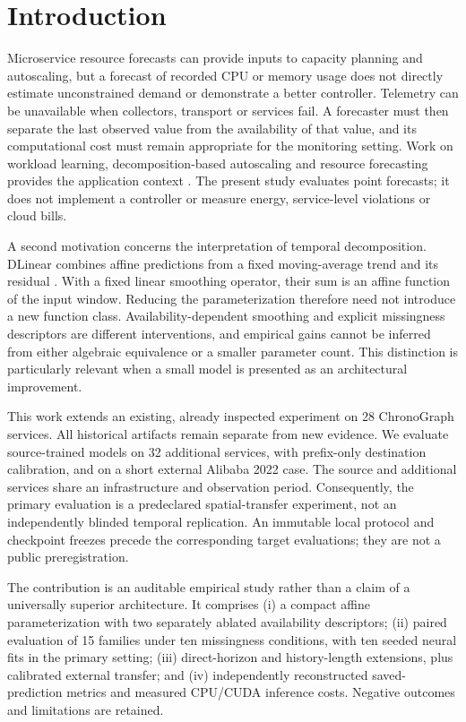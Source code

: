\section{Introduction}
Microservice resource forecasts can provide inputs to capacity planning and autoscaling, but a forecast of recorded CPU or memory usage does not directly estimate unconstrained demand or demonstrate a better controller. Telemetry can be unavailable when collectors, transport or services fail. A forecaster must then separate the last observed value from the availability of that value, and its computational cost must remain appropriate for the monitoring setting. Work on workload learning, decomposition-based autoscaling and resource forecasting provides the application context \cite{powerprediction,autoscaling2025,temposcale,aero}. The present study evaluates point forecasts; it does not implement a controller or measure energy, service-level violations or cloud bills.

A second motivation concerns the interpretation of temporal decomposition. DLinear combines affine predictions from a fixed moving-average trend and its residual \cite{dlinear}. With a fixed linear smoothing operator, their sum is an affine function of the input window. Reducing the parameterization therefore need not introduce a new function class. Availability-dependent smoothing and explicit missingness descriptors are different interventions, and empirical gains cannot be inferred from either algebraic equivalence or a smaller parameter count. This distinction is particularly relevant when a small model is presented as an architectural improvement.

This work extends an existing, already inspected experiment on 28 ChronoGraph services. All historical artifacts remain separate from new evidence. We evaluate source-trained models on 32 additional services, with prefix-only destination calibration, and on a short external Alibaba 2022 case. The source and additional services share an infrastructure and observation period. Consequently, the primary evaluation is a predeclared spatial-transfer experiment, not an independently blinded temporal replication. An immutable local protocol and checkpoint freezes precede the corresponding target evaluations; they are not a public preregistration.

The contribution is an auditable empirical study rather than a claim of a universally superior architecture. It comprises (i) a compact affine parameterization with two separately ablated availability descriptors; (ii) paired evaluation of 15 families under ten missingness conditions, with ten seeded neural fits in the primary setting; (iii) direct-horizon and history-length extensions, plus calibrated external transfer; and (iv) independently reconstructed saved-prediction metrics and measured CPU/CUDA inference costs. Negative outcomes and limitations are retained.

